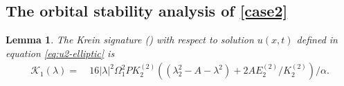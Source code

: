 \documentclass[11pt,reqno]{amsart}
\newtheorem{lemma}{Lemma}
\numberwithin{equation}{section}
\begin{document}
\subsection{The orbital stability analysis of \ref{case2}} \label{subsec:orbital-cn}


\begin{lemma}\label{lemma:Krein}
	The Krein signature () with respect to solution $u(x,t)$ defined in equation \eqref{eq:u2-elliptic} is 
	\begin{equation}\label{eq:Krein-value}
		\begin{split}
			\mathcal{K}_1(\lambda)
			=&\ 16|\lambda|^2 \Omega_1^2P  K^{(2)}_2 \left((\lambda_2^2-A-\lambda^2)+2A E^{(2)}_2/  K^{(2)}_2\right)/\alpha.
		\end{split}
	\end{equation} 
\end{lemma}
\end{document}
